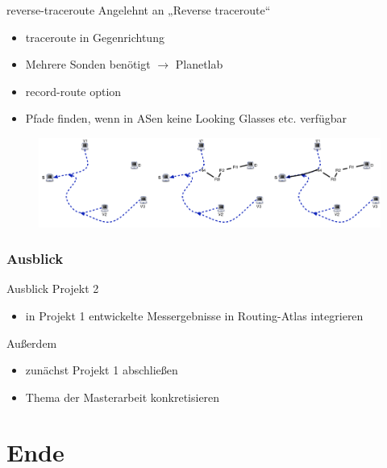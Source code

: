 \documentclass[ngerman,compress]{beamer}
\begin{document}
\begin{frame}{reverse-traceroute}
  Angelehnt an „Reverse traceroute“ \cite{Katz-Bassett:2010:RT:1855711.1855726}
  \begin{itemize}
    \item traceroute in Gegenrichtung
    \item Mehrere Sonden benötigt $\rightarrow$ Planetlab
    \item record-route option
    \item Pfade finden, wenn in ASen keine Looking Glasses etc. verfügbar
  \end{itemize}
  \begin{figure}
    \label{reverse_traceroute}
    \includegraphics[width=1\textwidth]{images/reverse_traceroute_overview}
  \end{figure}
\end{frame}

\section{Ausblick}
\begin{frame}{Ausblick}
  Projekt 2
  \begin{itemize}
    \item in Projekt 1 entwickelte Messergebnisse in Routing-Atlas integrieren
  \end{itemize}
  \vspace{0.3cm}
  Außerdem
  \begin{itemize}
    \item zunächst Projekt 1 abschließen
    \item Thema der Masterarbeit konkretisieren
  \end{itemize}
\end{frame}

\part{Ende}
\end{document}
